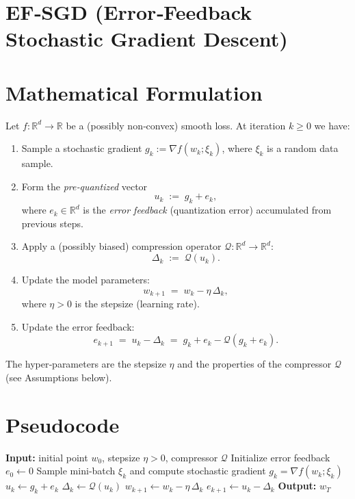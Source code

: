 \documentclass{article}
\newcommand{\R}{\mathbb{R}}
\newcommand{\Q}{\mathcal{Q}}
\begin{document}
\section*{EF‑SGD (Error‑Feedback Stochastic Gradient Descent)}

\section*{Mathematical Formulation}
Let $f:\R^{d}\rightarrow\R$ be a (possibly non‑convex) smooth loss.  
At iteration $k\ge 0$ we have:

\begin{enumerate}[label=\arabic*)]
\item Sample a stochastic gradient $g_k:=\nabla f(w_k;\xi_k)$, where $\xi_k$ is a random data sample.
\item Form the \emph{pre‑quantized} vector
\[
u_k \;:=\; g_k + e_k ,
\]
where $e_k\in\R^{d}$ is the \emph{error feedback} (quantization error) accumulated from previous steps.
\item Apply a (possibly biased) compression operator $\Q:\R^{d}\rightarrow\R^{d}$:
\[
\Delta_k \;:=\; \Q(u_k).
\]
\item Update the model parameters:
\[
w_{k+1}\;=\; w_k - \eta\,\Delta_k ,
\]
where $\eta>0$ is the stepsize (learning rate).
\item Update the error feedback:
\[
e_{k+1}\;=\; u_k - \Delta_k \;=\; g_k + e_k - \Q(g_k+e_k).
\]
\end{enumerate}

The hyper‑parameters are the stepsize $\eta$ and the properties of the compressor $\Q$ (see Assumptions below).

\section*{Pseudocode}
\begin{algorithm}[H]
\caption{EF‑SGD}
\begin{algorithmic}[1]
\STATE \textbf{Input:} initial point $w_0$, stepsize $\eta>0$, compressor $\Q$
\STATE Initialize error feedback $e_0\gets 0$
    \STATE Sample mini‑batch $\xi_k$ and compute stochastic gradient $g_k=\nabla f(w_k;\xi_k)$
    \STATE $u_k \gets g_k + e_k$
    \STATE $\Delta_k \gets \Q(u_k)$          
    \STATE $w_{k+1} \gets w_k - \eta\,\Delta_k$
    \STATE $e_{k+1} \gets u_k - \Delta_k$   
\ENDFOR
\STATE \textbf{Output:} $w_T$
\end{algorithmic}
\end{algorithm}
\end{document}
